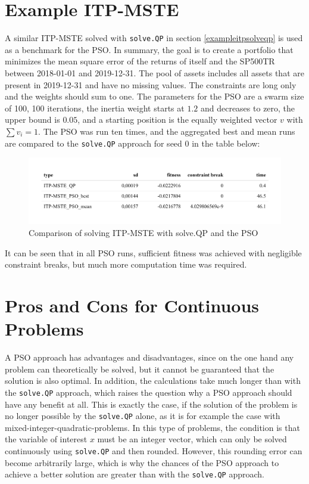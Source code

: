 \documentclass[
  oneside, a4paper, 12pt, openany]{book}
\theoremstyle{definition}
\theoremstyle{definition}
\theoremstyle{definition}
\theoremstyle{definition}
\theoremstyle{remark}
\begin{document}
\hypertarget{example-itp-mste}{%
\section{Example ITP-MSTE}\label{example-itp-mste}}

A similar ITP-MSTE solved with \texttt{solve.QP} in section \ref{exampleitpsolveqp} is used as a benchmark for the PSO. In summary, the goal is to create a portfolio that minimizes the mean square error of the returns of itself and the SP500TR between 2018-01-01 and 2019-12-31. The pool of assets includes all assets that are present in 2019-12-31 and have no missing values. The constraints are long only and the weights should sum to one. The parameters for the PSO are a swarm size of 100, 100 iterations, the inertia weight starts at \(1.2\) and decreases to zero, the upper bound is \(0.05\), and a starting position is the equally weighted vector \(v\) with \(\textstyle\sum v_i=1\). The PSO was run ten times, and the aggregated best and mean runs are compared to the \texttt{solve.QP} approach for seed 0 in the table below:

\begin{figure}[H]
\includegraphics{Master_Thesis_files/figure-latex/pso8-1} \caption{Comparison of solving ITP-MSTE with solve.QP and the PSO}\label{fig:pso8}
\end{figure}

It can be seen that in all PSO runs, sufficient fitness was achieved with negligible constraint breaks, but much more computation time was required.

\hypertarget{pros-and-cons-for-continuous-problems}{%
\section{Pros and Cons for Continuous Problems}\label{pros-and-cons-for-continuous-problems}}

A PSO approach has advantages and disadvantages, since on the one hand any problem can theoretically be solved, but it cannot be guaranteed that the solution is also optimal. In addition, the calculations take much longer than with the \texttt{solve.QP} approach, which raises the question why a PSO approach should have any benefit at all. This is exactly the case, if the solution of the problem is no longer possible by the \texttt{solve.QP} alone, as it is for example the case with mixed-integer-quadratic-problems. In this type of problems, the condition is that the variable of interest \(x\) must be an integer vector, which can only be solved continuously using \texttt{solve.QP} and then rounded. However, this rounding error can become arbitrarily large, which is why the chances of the PSO approach to achieve a better solution are greater than with the \texttt{solve.QP} approach.
\end{document}
